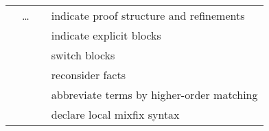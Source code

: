 \begin{isabellebody}
\begin{isamarkuptext}
\begin{tabular}{ll}
    \hyperlink{command.proof}{\mbox{\isa{\isacommand{proof}}}}~\isa{{\isaliteral{22}{\isachardoublequote}}m\isaliteral{5C3C5E7375623E}{}\isactrlsub {\isadigit{1}}{\isaliteral{22}{\isachardoublequote}}}~\dots~\hyperlink{command.qed}{\mbox{\isa{\isacommand{qed}}}}~\isa{{\isaliteral{22}{\isachardoublequote}}m\isaliteral{5C3C5E7375623E}{}\isactrlsub {\isadigit{2}}{\isaliteral{22}{\isachardoublequote}}} & indicate proof structure and refinements \\
    \hyperlink{command.braceleft}{\mbox{\isa{\isacommand{{\isaliteral{7B}{\isacharbraceleft}}}}}}~\isa{{\isaliteral{22}{\isachardoublequote}}{\isaliteral{5C3C646F74733E}{\isasymdots}}{\isaliteral{22}{\isachardoublequote}}}~\hyperlink{command.braceright}{\mbox{\isa{\isacommand{{\isaliteral{7D}{\isacharbraceright}}}}}} & indicate explicit blocks \\
    \hyperlink{command.next}{\mbox{\isa{\isacommand{next}}}} & switch blocks \\
    \hyperlink{command.note}{\mbox{\isa{\isacommand{note}}}}~\isa{{\isaliteral{22}{\isachardoublequote}}a\ {\isaliteral{3D}{\isacharequal}}\ b{\isaliteral{22}{\isachardoublequote}}} & reconsider facts \\
    \hyperlink{command.let}{\mbox{\isa{\isacommand{let}}}}~\isa{{\isaliteral{22}{\isachardoublequote}}p\ {\isaliteral{3D}{\isacharequal}}\ t{\isaliteral{22}{\isachardoublequote}}} & abbreviate terms by higher-order matching \\
    \hyperlink{command.write}{\mbox{\isa{\isacommand{write}}}}~\isa{{\isaliteral{22}{\isachardoublequote}}c\ \ {\isaliteral{28}{\isacharparenleft}}mx{\isaliteral{29}{\isacharparenright}}{\isaliteral{22}{\isachardoublequote}}} & declare local mixfix syntax \\
  \end{tabular}

  \medskip


\end{isamarkuptext}
\end{isabellebody}
